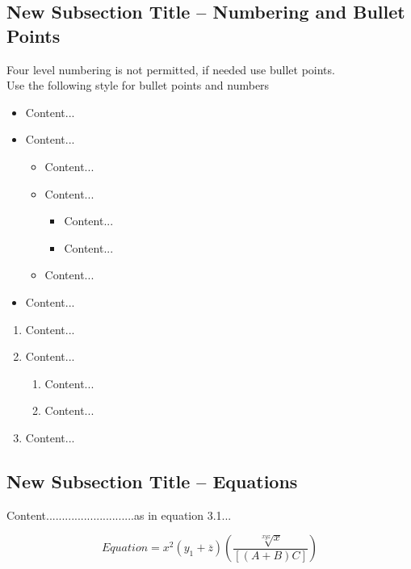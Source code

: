 \subsection{New Subsection Title – Numbering and Bullet Points}
\begin{justify}

    Four level numbering is not permitted, if needed use bullet points.\\
    Use the following style for bullet points and numbers
    \begin{itemize}
        \item Content...
        \item Content...
            \begin{itemize}
                \item Content...
                \item Content...
                    \begin{itemize}
                        \item Content...
                        \item Content...
                    \end{itemize}
                \item Content...
            \end{itemize}
        \item Content...
    \end{itemize}

    \begin{enumerate}
        \item Content...
        \item Content...
            \begin{enumerate}
                \item Content...
                \item Content...
            \end{enumerate}
        \item Content...
    \end{enumerate}

\end{justify}

\subsection{New Subsection Title – Equations}
\begin{justify}

   Content............................as in equation 3.1...
    \begin{fleqn}
        \begin{equation}
            Equation = x^2 (y_1 + \overline{z}) \left( \frac{\sqrt[xyz]{x}}{[(A+B) C]} \right)
            \label{eq:1}
        \end{equation}
   \end{fleqn}

\end{justify}


